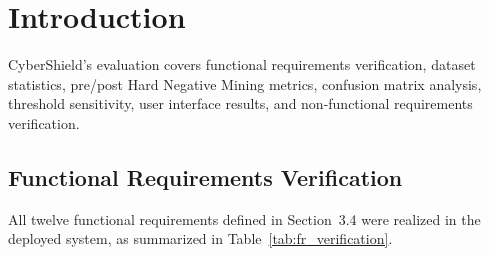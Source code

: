 \section{Introduction}
CyberShield's evaluation covers functional requirements verification, dataset statistics, pre/post Hard Negative Mining metrics, confusion matrix analysis, threshold sensitivity, user interface results, and non-functional requirements verification.

\subsection{Functional Requirements Verification}
All twelve functional requirements defined in Section~3.4 were realized in the deployed system, as summarized in Table~\ref{tab:fr_verification}.

